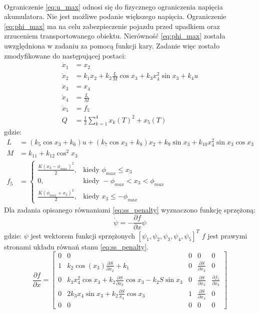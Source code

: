 \paragraph*{}
Ograniczenie \eqref{eq:u_max} odnosi się do fizycznego ograniczenia napięcia akumulatora. Nie jest możliwe podanie większego napięcia. Ograniczenie \eqref{eq:phi_max} ma na celu zabezpieczenie pojazdu przed upadkiem oraz zrzuceniem transportowanego obiektu. Nierówność \eqref{eq:phi_max} została uwzględniona w zadaniu za pomocą funkcji kary. Zadanie więc zostało zmodyfikowane do następującej postaci:
\begin{equation}
\begin{aligned}
\dot x_1 &=x_2\\
\dot x_2 &=k_1x_2+k_2\frac{L}{M}\cos x_3+k_3x_4^2\sin x_3+k_4u\\
\dot x_3 &=x_4\\
\dot x_4 &=\frac{L}{M}\\
\dot x_5 &=f_5\\
Q &=\frac{1}{2}\sum\limits_{k=1}^4 x_k(T)^2+x_5(T)
\end{aligned}
\label{eq:ss_penalty}
\end{equation}
\noindent gdzie:
\begin{equation}
\begin{aligned}
L &=(k_5\cos x_3+k_6)u+(k_7\cos x_3+k_8)x_2+k_9\sin x_3+k_{10}x_4^2\sin x_3\cos x_3\\
M &=k_{11}+k_{12}\cos ^2x_3\\
f_5 &=
	\begin{cases}
	\frac{K(x_3-\phi_{max})^2}{2}, & \text{kiedy } \phi_{max}\leqslant x_3\\
	0, & \text{kiedy } -\phi_{max}<x_3<\phi_{max}\\
	\frac{K(\phi_{max}+x_3)^2}{2}, & \text{kiedy } x_3\leqslant -\phi_{max}
	\end{cases}
\end{aligned}
\end{equation}
Dla zadania opisanego równaniami \eqref{eq:ss_penalty} wyznaczono funkcję sprzężoną:
\begin{equation}
\dot \psi=-\frac{\partial f}{\partial x}\psi
\end{equation}
\noindent gdzie:\newline
\(\psi\) jest wektorem funkcji sprzężonych \([\psi_1, \psi_2, \psi_3, \psi_4, \psi_5]^T\)\newline
\(f\) jest prawymi stronami układu równań stanu \eqref{eq:ss_penalty}.
\begin{equation}
\frac{\partial f}{\partial x}=\begin{bmatrix}
0 & 0 & 0 & 0 & 0\\
1 & k_2\cos(x_3)\frac{\partial S}{\partial x_2}+k_1 & 0 & \frac{\partial S}{\partial x_2} & 0\\
0 & k_3x_4^2\cos x_3+k_2\frac{\partial S}{\partial x_3}\cos x_3-k_2S\sin x_3 & 0 & \frac{\partial S}{\partial x_3} & \frac{\partial f_5}{\partial x_3}\\
0 & 2k_3x_4\sin x_3+k_2\frac{\partial S}{x_4}\cos x_3 & 1 & \frac{\partial S}{\partial x_4} & 0\\
0 & 0 & 0 & 0 & 0
\end{bmatrix}
\end{equation}
